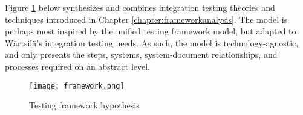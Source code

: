 \documentclass[12pt,a4paper,oneside,pdftex]{report}
\begin{document}
{Figure \ref{fig:framework} below synthesizes and combines integration testing theories and techniques introduced in Chapter \ref{chapter:frameworkanalysis}. The model is perhaps most inspired by the \citet{liu2009unified} unified testing framework model, but adapted to Wärtsilä's integration testing needs. As such, the model is technology-agnostic, and only presents the steps, systems, system-document relationships, and processes required on an abstract level.


\begin{figure}[H]
\centering
\texttt{[image: framework.png]}
\caption{Testing framework hypothesis}
\label{fig:framework}
\end{figure}

\begin{comment}
\begin{figure}[H]
\centering
\pgfdeclarelayer{marx}
\pgfsetlayers{main,marx}
\xdefinecolor{lightgrey}{RGB}{220,220,220}
\xdefinecolor{blackish}{RGB}{30,30,30}
\begin{tikzpicture}[
    start chain=going below,    %
    node distance=6mm and 50mm, %
    ]
\tikzset{
  base/.style={draw, on chain, on grid, align=center, minimum height=4ex},
  proc/.style={base, rectangle, minimum height=4em, text width=7em},
  sut/.style={base, circle, text width=5em, fill = blackish, text = white},
  syst/.style={base, cylinder, shape border rotate=90,  aspect=.2, minimum height=5em, text width=5em},
  file/.style={base, rectangle, shape border rotate=90, minimum height=4em, text width=3em, fill = lightgrey},
  data/.style={base, trapezium, trapezium left angle=70, trapezium right angle=-70, minimum height=1cm}, 
  line/.style={draw, thick, -latex'},
  dots/.style={draw, dotted, -latex'}
}

\node [proc] (cap) {Capturing messages};
\node [proc] (gen) {Integration test case/surrogate generation};
\node [proc] (upd) {Updating test package/resources};
\node [syst] (db) {Test data base};
\node [proc] (exe) {Test case execution};
\node [sut] (sut) {System under test};
\node [file, right=of cap] (rec) {Mes-sage record};
\node [file, rihgt=of gen] (cse) {Case/ surrogate};
\node [proc, right=of upd] (ver) {Verification};
\node [file, right=of db] (trc) {Exe-cution trace};
\node [proc, right=of exe] (col) {Trace collecting};


\end{comment}}
\end{document}
